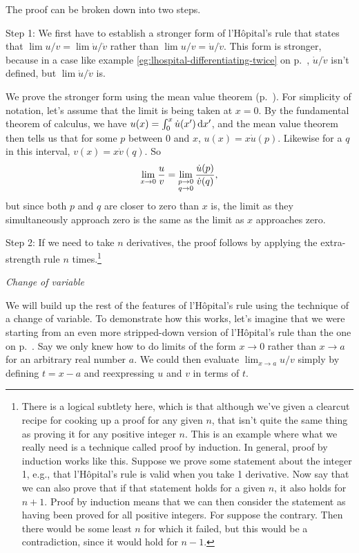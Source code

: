 The proof can be broken down into two steps.

Step 1: We first have to establish a stronger form of l'H\^{o}pital's rule
that states that $\lim u/v=\lim \dot{u}/\dot{v}$ rather than $\lim u/v=\dot{u}/\dot{v}$.
This form is stronger, because in a case like example \ref{eg:lhospital-differentiating-twice} on p.~\pageref{eg:lhospital-differentiating-twice},
$\dot{u}/\dot{v}$ isn't defined, but $\lim \dot{u}/\dot{v}$ is.

We prove the stronger form using the mean value theorem (p.~\pageref{mean-value-theorem-stated}).
For simplicity of notation, let's assume that the limit is being taken at $x=0$. By the fundamental theorem
of calculus, we have $u(x)=\int_0^x \dot{u}(x')\operatorname{d\!} x'$, and the mean value theorem then tells us that
for some $p$ between 0 and $x$, $u(x)=x\dot{u}(p)$. Likewise for a $q$ in this interval, $v(x)=x\dot{v}(q)$. 
So
\begin{equation*}
  \lim_{x\rightarrow 0} \frac{u}{v} = \lim_{\substack{p\rightarrow 0 \\q\rightarrow 0}} \frac{\dot{u}(p)}{\dot{v}(q)},
\end{equation*}
but since both $p$ and $q$ are closer to zero than $x$ is, the limit as they simultaneously approach zero is
the same as the limit as $x$ approaches zero.

Step 2: If we need
to take $n$ derivatives, the proof follows by applying the extra-strength rule $n$ times.\footnote{There is a logical
subtlety here, which is that although we've given a clearcut recipe for cooking up a proof for any given
$n$, that isn't quite the same thing as proving it for any positive integer $n$. This is an example where what we really need is a technique called
proof by induction. In general, proof by induction works like this. Suppose we prove some statement
about the integer 1, e.g., that l'H\^{o}pital's rule is valid when you take 1 derivative. Now say
that we can also prove that if that statement holds for a given $n$, it also holds for $n+1$. Proof by
induction means that we can then consider the statement as having been proved for all positive integers.
For suppose the contrary. Then there would be some least $n$ for which it failed, but this would
be a contradiction, since it would hold for $n-1$.}

\emph{Change of variable}

We will build up the rest of the features of l'H\^{o}pital's rule  using the technique of a change of variable. To demonstrate
how this works, let's imagine that we were starting from an even more stripped-down version of l'H\^{o}pital's rule
than the one on p.~\pageref{lhospital-simple}. Say we only knew how to do limits of the form $x\rightarrow0$ rather than
$x\rightarrow a$ for an arbitrary real number $a$. We could then evaluate $\lim_{x\rightarrow a} u/v$ simply
by defining $t=x-a$ and reexpressing $u$ and $v$ in terms of $t$.

